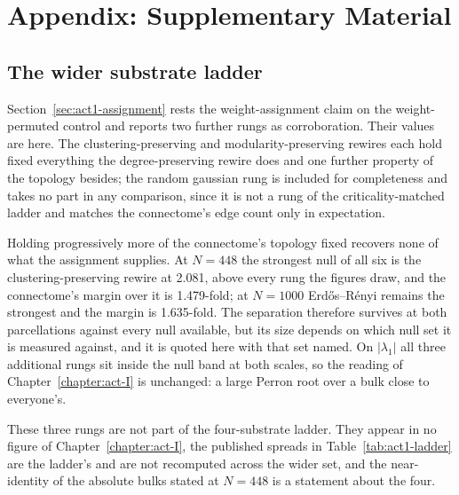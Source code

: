 \chapter{Appendix: Supplementary Material}
\label{appendix:supplementary}


\section{The wider substrate ladder}
\label{app:wider-ladder}
\bigskip

Section~\ref{sec:act1-assignment} rests the weight-assignment claim on the
weight-permuted control and reports two further rungs as corroboration. Their
values are here. The clustering-preserving and modularity-preserving rewires
each hold fixed everything the degree-preserving rewire does and one further
property of the topology besides; 
the random gaussian rung is included for completeness and takes no part in any
comparison, since it is not a rung of the criticality-matched ladder and matches
the connectome's edge count only in expectation.

Holding progressively more of the connectome's topology fixed recovers none
of what the assignment supplies. At $N = 448$ the strongest null of all six is the
clustering-preserving rewire at
2.081, %
above every rung the figures draw, and the connectome's margin over it is
1.479-fold; %
at $N = 1000$ Erdős–Rényi remains the strongest and the margin is
1.635-fold. %
The separation therefore survives at both parcellations against every null
available, but its size depends on which null set it is measured against, and it
is quoted here with that set named. On $|\lambda_1|$ all three additional rungs
sit inside the null band at both scales, so the reading of
Chapter~\ref{chapter:act-I} is unchanged: a large Perron root over a bulk close
to everyone's.

These three rungs are not part of the four-substrate ladder. They appear in no
figure of Chapter~\ref{chapter:act-I}, the published spreads in
Table~\ref{tab:act1-ladder} are the ladder's and are not recomputed across the
wider set, and the near-identity of the absolute bulks stated at $N = 448$ is a
statement about the four.


